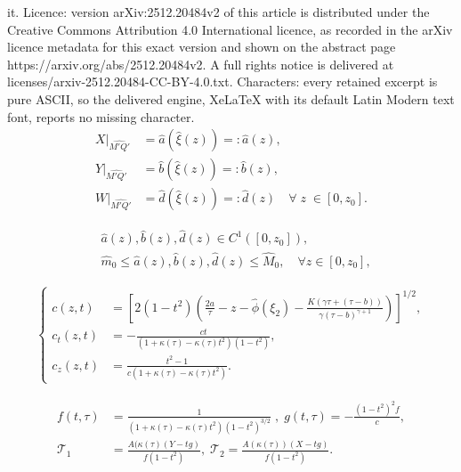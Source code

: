 \documentclass[10pt,a4paper]{amsart}
\begin{document}
it. Licence: version arXiv:2512.20484v2 of this article is distributed under the Creative Commons Attribution 4.0 International licence, as recorded in the arXiv licence metadata for this exact version and shown on the abstract page https://arxiv.org/abs/2512.20484v2. A full rights notice is delivered at licenses/arxiv-2512.20484-CC-BY-4.0.txt. Characters: every retained excerpt is pure ASCII, so the delivered engine, XeLaTeX with its default Latin Modern text font, reports no missing character.
\begin{equation}\label{Sol1_3}
\begin{split}
    {X}|_{\widehat{M'Q'}} &= \hat{a}(\hat{\xi}(z)) =: \hat{a}(z), \\
    { Y}|_{\widehat{M'Q'}} &= \hat{b}(\hat{\xi}(z)) =: \hat{b}(z), \\
   W|_{\widehat{M'Q'}} &=\hat{d}(\hat{\xi}(z)) =: \hat{d}(z) \quad \forall \;z \; \in [0,z_0].
\end{split}
\end{equation}

\begin{equation}\label{Sol1_4}
\begin{split}
    &\hat{a}(z), \hat{b}(z), \hat{d}(z) \in C^1([0,z_0]), \\
    &\hat{m}_0 \leq \hat{a}(z), \hat{b}(z), \hat{d}(z) \leq \hat{M}_0, \quad \forall z \in [0,z_0],
\end{split}
\end{equation}

\begin{equation}\label{Sol1_7}
    \begin{split}
        \begin{cases}
             c(z,t) &= \left[2(1-t^2)\left(\frac{2a}{\tau}-z-\hat\phi(\xi_2)-\frac{K(\gamma\tau+(\tau-b))}{\gamma(\tau-b)^{\gamma+1}} \right) \right]^{1/2},\\
             c_t(z,t) &=-\frac{ct}{(1+\kappa(\tau)-\kappa(\tau) t^2)(1-t^2)},\\ 
             c_z(z,t) &=\frac{t^2-1}{c(1+\kappa(\tau)-\kappa(\tau) t^2)}.
        \end{cases}
    \end{split}
\end{equation}

\begin{equation}\label{Sol1_10}
\begin{split}
    f(t,\tau) &=\frac{1}{(1+\kappa(\tau)-\kappa(\tau)t^2)(1-t^2)^{3/2}}\;, \; g(t,\tau) = -\frac{(1-t^2)^2f}{c},\\
    \mathcal{T}_1 &= \frac{A(\kappa(\tau)(Y-tg)}{f(1-t^2)},\;%
    \mathcal{T}_2 = \frac{A(\kappa(\tau))(X-tg)}{f(1-t^2)}.
\end{split}
\end{equation}
\end{document}
